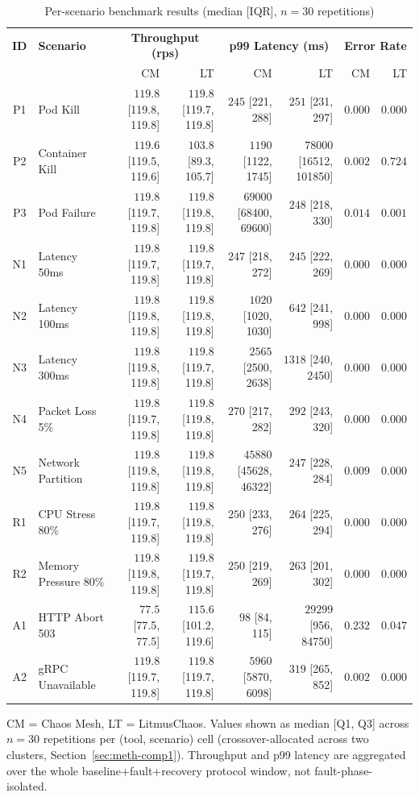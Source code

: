 \begin{table}[ht]
\centering
\caption{Per-scenario benchmark results (median [IQR], $n=30$ repetitions)}
\label{tab:results}
\scriptsize
\begin{tabular}{clrrrrrr}
\hline
\textbf{ID} & \textbf{Scenario} & \multicolumn{2}{c}{\textbf{Throughput (rps)}} & \multicolumn{2}{c}{\textbf{p99 Latency (ms)}} & \multicolumn{2}{c}{\textbf{Error Rate}} \\
& & CM & LT & CM & LT & CM & LT \\
\hline
P1 & Pod Kill & $119.8$ [119.8, 119.8] & $119.8$ [119.7, 119.8] & $245$ [221, 288] & $251$ [231, 297] & $0.000$ & $0.000$ \\
P2 & Container Kill & $119.6$ [119.5, 119.6] & $103.8$ [89.3, 105.7] & $1190$ [1122, 1745] & $78000$ [16512, 101850] & $0.002$ & $0.724$ \\
P3 & Pod Failure & $119.8$ [119.7, 119.8] & $119.8$ [119.8, 119.8] & $69000$ [68400, 69600] & $248$ [218, 330] & $0.014$ & $0.001$ \\
\hline
N1 & Latency 50ms & $119.8$ [119.7, 119.8] & $119.8$ [119.7, 119.8] & $247$ [218, 272] & $245$ [222, 269] & $0.000$ & $0.000$ \\
N2 & Latency 100ms & $119.8$ [119.8, 119.8] & $119.8$ [119.8, 119.8] & $1020$ [1020, 1030] & $642$ [241, 998] & $0.000$ & $0.000$ \\
N3 & Latency 300ms & $119.8$ [119.8, 119.8] & $119.8$ [119.7, 119.8] & $2565$ [2500, 2638] & $1318$ [240, 2450] & $0.000$ & $0.000$ \\
N4 & Packet Loss 5\% & $119.8$ [119.7, 119.8] & $119.8$ [119.8, 119.8] & $270$ [217, 282] & $292$ [243, 320] & $0.000$ & $0.000$ \\
N5 & Network Partition & $119.8$ [119.8, 119.8] & $119.8$ [119.8, 119.8] & $45880$ [45628, 46322] & $247$ [228, 284] & $0.009$ & $0.000$ \\
\hline
R1 & CPU Stress 80\% & $119.8$ [119.7, 119.8] & $119.8$ [119.8, 119.8] & $250$ [233, 276] & $264$ [225, 294] & $0.000$ & $0.000$ \\
R2 & Memory Pressure 80\% & $119.8$ [119.8, 119.8] & $119.8$ [119.7, 119.8] & $250$ [219, 269] & $263$ [201, 302] & $0.000$ & $0.000$ \\
\hline
A1 & HTTP Abort 503 & $77.5$ [77.5, 77.5] & $115.6$ [101.2, 119.6] & $98$ [84, 115] & $29299$ [956, 84750] & $0.232$ & $0.047$ \\
A2 & gRPC Unavailable & $119.8$ [119.7, 119.8] & $119.8$ [119.7, 119.8] & $5960$ [5870, 6098] & $319$ [265, 852] & $0.002$ & $0.000$ \\
\hline
\end{tabular}
\vspace{2mm}
\raggedright\footnotesize CM = Chaos Mesh, LT = LitmusChaos. Values shown as median [Q1, Q3] across $n=30$ repetitions per (tool, scenario) cell (crossover-allocated across two clusters, Section~\ref{sec:meth-comp1}). Throughput and p99 latency are aggregated over the whole baseline+fault+recovery protocol window, not fault-phase-isolated.
\end{table}